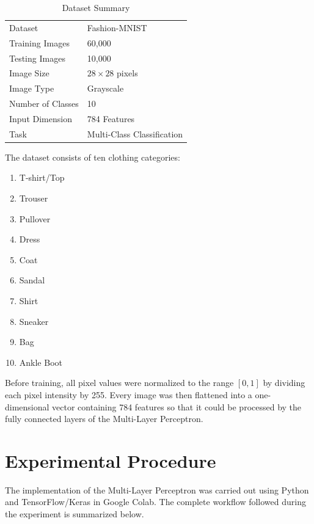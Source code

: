 \documentclass[12pt,a4paper]{article}
\begin{document}
\begin{table}[H]
\centering
\caption{Dataset Summary}
\begin{tabular}{ll}
\toprule
Dataset & Fashion-MNIST\\
Training Images & 60,000\\
Testing Images & 10,000\\
Image Size & $28 \times 28$ pixels\\
Image Type & Grayscale\\
Number of Classes & 10\\
Input Dimension & 784 Features\\
Task & Multi-Class Classification\\
\bottomrule
\end{tabular}
\end{table}

The dataset consists of ten clothing categories:

\begin{enumerate}
\item T-shirt/Top
\item Trouser
\item Pullover
\item Dress
\item Coat
\item Sandal
\item Shirt
\item Sneaker
\item Bag
\item Ankle Boot
\end{enumerate}

Before training, all pixel values were normalized to the range $[0,1]$ by dividing each pixel intensity by 255. Every image was then flattened into a one-dimensional vector containing 784 features so that it could be processed by the fully connected layers of the Multi-Layer Perceptron.
\section{Experimental Procedure}

The implementation of the Multi-Layer Perceptron was carried out using Python and TensorFlow/Keras in Google Colab. The complete workflow followed during the experiment is summarized below.
\end{document}

